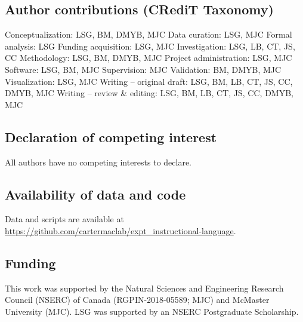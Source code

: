 \documentclass[doc,floatsintext,donotrepeattitle,letterpaper,12pt]{apa7}
\begin{document}
\clearpage

\subsection{Author contributions (CRediT Taxonomy)}

\noindent Conceptualization: LSG, BM, DMYB, MJC \newline
\noindent Data curation: LSG, MJC \newline
\noindent Formal analysis: LSG \newline
\noindent Funding acquisition: LSG, MJC \newline
\noindent Investigation: LSG, LB, CT, JS, CC \newline
\noindent Methodology: LSG, BM, DMYB, MJC \newline
\noindent Project administration: LSG, MJC \newline
\noindent Software: LSG, BM, MJC \newline
\noindent Supervision: MJC \newline
\noindent Validation: BM, DMYB, MJC \newline
\noindent Visualization: LSG, MJC \newline
\noindent Writing -- original draft: LSG, BM, LB, CT, JS, CC, DMYB, MJC \newline
\noindent Writing -- review \& editing: LSG, BM, LB, CT, JS, CC, DMYB, MJC

\subsection{Declaration of competing interest}

\noindent All authors have no competing interests to declare.

\subsection{Availability of data and code}

\noindent Data and scripts are available at \url{https://github.com/cartermaclab/expt_instructional-language}.

\subsection{Funding}

\noindent This work was supported by the Natural Sciences and Engineering Research Council (NSERC) of Canada (RGPIN-2018-05589; MJC) and McMaster University (MJC). LSG was supported by an NSERC Postgraduate Scholarship.

\clearpage

\printbibliography
\end{document}
